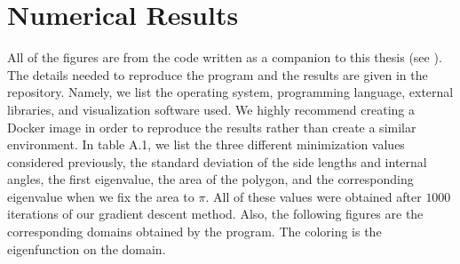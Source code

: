 \documentclass[12pt]{report}
\numberwithin{definition}{section}
\begin{document}
\appendix
\chapter{Numerical Results}
\break

All of the figures are from the code written as a companion to this thesis (see \cite{code}).
The details needed to reproduce the program and the results are given in the repository.
Namely, we list the operating system, programming language, external libraries, and visualization software used.
We highly recommend creating a Docker image in order to reproduce the results rather than create a similar environment.
In table A.1, we list the three different minimization values considered previously, the standard deviation of the side lengths and internal angles, the first eigenvalue, the area of the polygon, and the corresponding eigenvalue when we fix the area to $\pi$.
All of these values were obtained after $1000$ iterations of our gradient descent method.
Also, the following figures are the corresponding domains obtained by the program.
The coloring is the eigenfunction on the domain.
\end{document}
